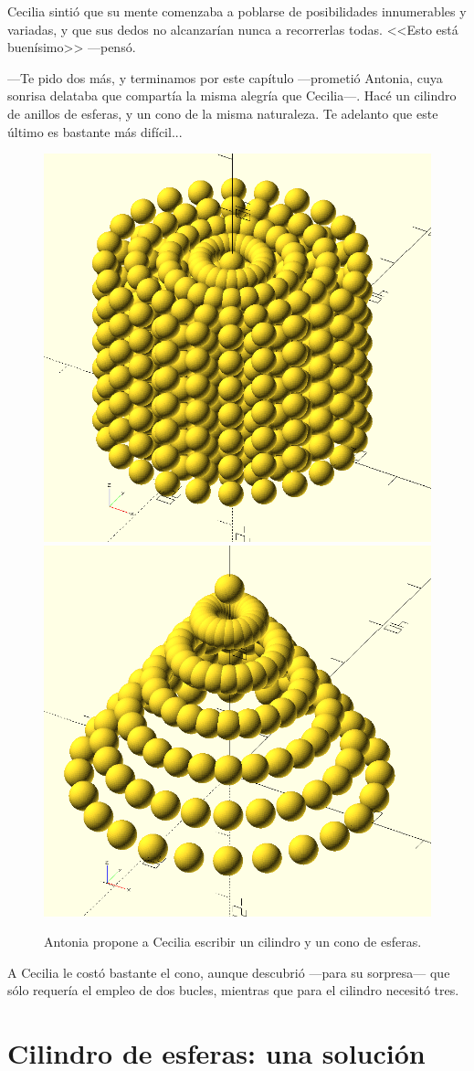   Cecilia sintió que su mente comenzaba a poblarse de posibilidades
  innumerables y variadas, y que sus dedos no alcanzarían nunca a
  recorrerlas todas. <<Esto está buenísimo>> ---pensó.

  ---Te pido dos más, y terminamos por este capítulo ---pro\-me\-tió
  Antonia, cuya sonrisa delataba que compartía la misma alegría que
  Cecilia---. Hacé un cilindro de anillos de esferas, y un cono de la
  misma naturaleza. Te adelanto que este último es bastante más
  difícil...


  \begin{figure}[ht]
    \centering
    \includegraphics[width=.49\textwidth]{imagenes/cilindro-de-esferas}\hfill
    \includegraphics[width=.49\textwidth]{imagenes/cono-de-esferas}    
    \caption{Antonia propone a Cecilia escribir un cilindro y un cono
      de esferas.}
    \label{fig:cilindro-y-cono-de-esferas}
  \end{figure}


  A Cecilia le costó bastante el cono, aunque descubrió \mbox{---pa}\-ra su
  sorpresa--- que sólo requería el empleo de dos bucles, mientras que
  para el cilindro necesitó tres.


\section{Cilindro de esferas: una solución}


